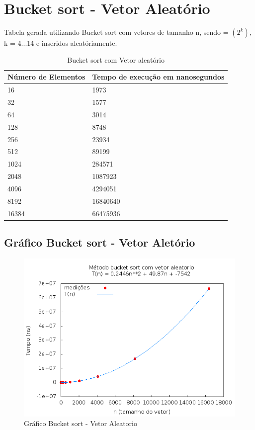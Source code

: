 \documentclass[12pt,a4paper,twoside]{report}
\begin{document}
\section{Bucket sort - Vetor Aleatório}
Tabela gerada utilizando Bucket sort com vetores de tamanho n, sendo = $(2^k)$, k = 4...14 e inseridos aleatóriamente.
\begin{table}[H]
\centering
\caption{Bucket sort com Vetor aleatório}
\begin{tabular}{|l|l|}
\hline
\multicolumn{1}{|c|}{\textbf{Número de Elementos}} & \multicolumn{1}{c|}{\textbf{Tempo de execução em nanosegundos}} \\ \hline
16 & 1973 \\ \hline
32 & 1577 \\ \hline
64 & 3014 \\ \hline
128 & 8748 \\ \hline
256 & 23934 \\ \hline
512 & 89199 \\ \hline
1024 & 284571 \\ \hline
2048 & 1087923 \\ \hline
4096 & 4294051 \\ \hline
8192 & 16840640 \\ \hline
16384 & 66475936 \\ \hline
\end{tabular}
\end{table}


\subsection{Gráfico Bucket sort - Vetor Aletório}
\begin{figure}[H]
    \centering
    \includegraphics[width=0.7\linewidth]{graficos/Bucket/vIntAleatorio/vIntAleatorio.png}
  \caption{Gráfico Bucket sort - Vetor Aleatorio}
\end{figure}
\end{document}
